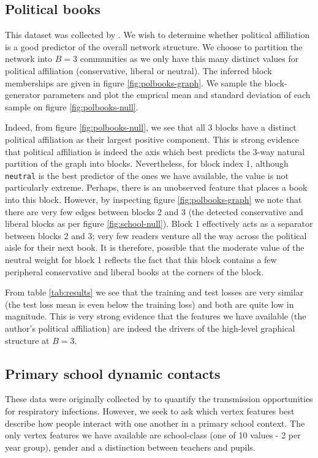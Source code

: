 \subsection{Political books}

This dataset was collected by \citet{polbooks}. We wish to determine whether political affiliation is a good predictor of the overall network structure. We choose to partition the network into $B=3$ communities as we only have this many distinct values for political affiliation (conservative, liberal or neutral). The inferred block memberships are given in figure \ref{fig:polbooks-graph}. We sample the block-generator parameters and plot the emprical mean and standard deviation of each sample on figure \ref{fig:polbooks-null}.

Indeed, from figure \ref{fig:polbooks-null}, we see that all 3 blocks have a distinct political affiliation as their largest positive component. This is strong evidence that political affiliation is indeed the axis which best predicts the 3-way natural partition of the graph into blocks. Nevertheless, for block index 1, although \verb*|neutral| is the best predictor of the ones we have available, the value is not particularly extreme. Perhaps, there is an unobserved feature that places a book into this block. However, by inspecting figure \ref{fig:polbooks-graph} we note that there are very few edges between blocks 2 and 3 (the detected conservative and liberal blocks as per figure \ref{fig:school-null}). Block 1 effectively acts as a separator between blocks 2 and 3; very few readers venture all the way across the political aisle for their next book. It is therefore, possible that the moderate value of the neutral weight for block 1 reflects the fact that this block contains a few peripheral conservative and liberal books at the corners of the block.

From table \ref{tab:results} we see that the training and test losses are very similar (the test loss mean is even below the training loss) and both are quite low in magnitude. This is very strong evidence that the features we have available (the author's political affiliation) are indeed the drivers of the high-level graphical structure at $B=3$.

\subsection{Primary school dynamic contacts}

These data were originally collected by \citet{schools} to quantify the transmission opportunities for respiratory infections. However, we seek to ask which vertex features best describe how people interact with one another in a primary school context. The only vertex features we have available are school-class (one of 10 values - 2 per year group), gender and a distinction between teachers and pupils.


